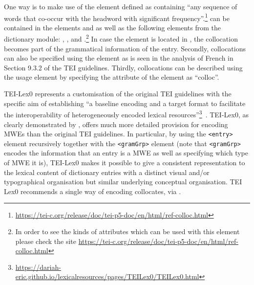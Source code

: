 \documentclass[output=paper,colorlinks,citecolor=brown]{langscibook}
\begin{document}

One way is to make use of the  element defined as containing ``any sequence of words that co-occur with the headword with significant frequency''.\footnote{\url{https://tei-c.org/release/doc/tei-p5-doc/en/html/ref-colloc.html}}  can be contained in the elements  and  as well as the following elements from the dictionary module: , ,   and .\footnote{In order to see the kinds of attributes which can be used with this element please check the site \url{https://tei-c.org/release/doc/tei-p5-doc/en/html/ref-colloc.html}} In case  the element is located in , the collocation becomes part of the grammatical information of the entry.  Secondly, collocations can also be specified using the  element     %
    as is seen in the analysis of French  in Section 9.3.2 of the TEI guidelines. Thirdly, collocations can be described using the usage element  by specifying the  attribute of the element as “colloc”.

TEI-Lex0 represents a  customisation of the original TEI guidelines with %
the specific aim of establishing “a baseline encoding and a target format to facilitate the interoperability of heterogeneously encoded lexical resources”\footnote{\url{https://dariah-eric.github.io/lexicalresources/pages/TEILex0/TEILex0.html}}~\citep{tasovac2020encoding}. TEI-Lex0, as clearly demonstrated by \citet{tasovac2020encoding}, offers much more detailed provision for encoding MWEs than the original TEI guidelines. %
In particular, by using the \texttt{<entry>} element recursively together with the \texttt{<gramGrp>} element (note that \texttt{<gramGrp>} encodes the information that an entry is a MWE as well as specifying which type of MWE it is), TEI-Lex0 makes it possible to give a consistent representation to the lexical content of dictionary entries with a distinct visual and/or typographical organisation but similar underlying conceptual organisation. TEI Lex0 recommends a single way of encoding collocates, via .
\end{document}
